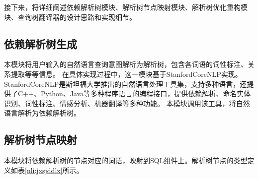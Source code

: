 
接下来，将详细阐述依赖解析树模块、解析树节点映射模块、解析树优化重构模块、查询树翻译器的设计思路和实现细节。

\subsection{依赖解析树生成}
\label{nli:yljxssc}

本模块将用户输入的自然语言查询意图解析为解析树，包含各词语的词性标注、关系提取等等信息。
在具体实现过程中，这一模块基于StanfordCoreNLP\cite{de2018generating}实现。
StanfordCoreNLP是斯坦福大学推出的自然语言处理工具集，支持多种语言，还提供了C++、Python、Java等多种程序语言的编程接口，提供依赖解析、命名实体识别、词性标注、情感分析、机器翻译等多种功能。
本模块调用该工具，将自然语言解析为依赖解析树。

\subsection{解析树节点映射}
\label{nli:jxsjdys}
本模块将依赖解析树的节点对应的词语，映射到SQL组件上。解析树节点的类型定义如表\ref{nli:jxsjddlx}所示。



